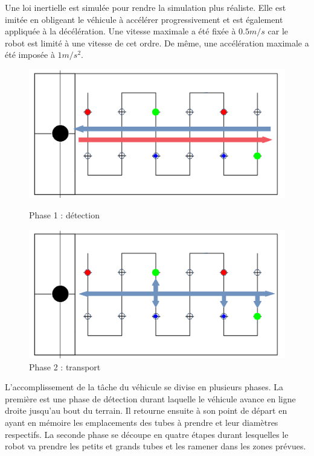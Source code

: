 \documentclass[a4paper,11pt]{article}
\begin{document}
Une loi inertielle est simulée pour rendre la simulation plus réaliste. Elle est imitée en obligeant le véhicule à accélérer progressivement et est également appliquée à la décélération. Une vitesse maximale a été fixée à $0.5m/s$ car le robot est limité à une vitesse de cet ordre. De même, une accélération maximale a été imposée à $1m/s^2$.
 
\begin{figure}[H]
    \begin{minipage}[c]{.46\linewidth}
        \centering
        \includegraphics[scale = 0.15]{simu_veh.png}
        \caption{Phase 1 : détection}
    \end{minipage}
    \hfill
    \begin{minipage}[c]{.46\linewidth}
        \centering        \includegraphics[scale = 0.15]{simu_veh2.png}
        \caption{Phase 2 : transport}
    \end{minipage}
\end{figure}
 
L'accomplissement de la tâche du véhicule se divise en plusieurs phases. La première est une phase de détection durant laquelle le véhicule avance en ligne droite jusqu'au bout du terrain. Il retourne ensuite à son point de départ en ayant en mémoire les emplacements des tubes à prendre et leur diamètres respectifs. La seconde phase se découpe en quatre étapes durant lesquelles le robot va prendre les petits et grands tubes et les ramener dans les zones prévues.
 
\end{document}
